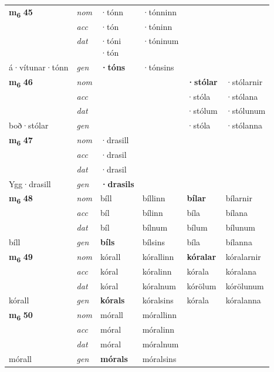 \begin{longtable}[l]{X>{\footnotesize\itshape}XXXXX}
\multirow{3}{*}{{{\textbf{m{\textsubscript{6}}} \Large{\textbf{45}}}}} & nom & ·tónn & ·tónninn & \textbf{} &  \\*
 & acc & ·tón & ·tóninn &  &  \\*
 & dat & \specialcell{·tóni\\  ·tón} & ·tóninum &  &  \\*
 {\footnotesize{á\allowbreak ·vítunar\allowbreak ·tónn}} & gen & \textbf{·tóns} & ·tónsins &  &  \\
\cmidrule{1-6}

\multirow{3}{*}{{{\textbf{m{\textsubscript{6}}} \Large{\textbf{46}}}}} & nom &  &  & \textbf{·stólar} & ·stólarnir \\*
 & acc &  &  & ·stóla & ·stólana \\*
 & dat &  &  & ·stólum & ·stólunum \\*
 {\footnotesize{boð\allowbreak ·stólar}} & gen & \textbf{} &  & ·stóla & ·stólanna \\
\cmidrule{1-6}

\multirow{3}{*}{{{\textbf{m{\textsubscript{6}}} \Large{\textbf{47}}}}} & nom & ·drasill &  & \textbf{} &  \\*
 & acc & ·drasil &  &  &  \\*
 & dat & ·drasil &  &  &  \\*
 {\footnotesize{Ygg\allowbreak ·drasill}} & gen & \textbf{·drasils} &  &  &  \\
\cmidrule{1-6}

\multirow{3}{*}{{{\textbf{m{\textsubscript{6}}} \Large{\textbf{48}}}}} & nom & bíll & bíllinn & \textbf{bílar} & bílarnir \\*
 & acc & bíl & bílinn & bíla & bílana \\*
 & dat & bíl & bílnum & bílum & bílunum \\*
 {\footnotesize{bíll}} & gen & \textbf{bíls} & bílsins & bíla & bílanna \\
\cmidrule{1-6}

\multirow{3}{*}{{{\textbf{m{\textsubscript{6}}} \Large{\textbf{49}}}}} & nom & kórall & kórallinn & \textbf{kóralar} & kóralarnir \\*
 & acc & kóral & kóralinn & kórala & kóralana \\*
 & dat & kóral & kóralnum & kórölum & kórölunum \\*
 {\footnotesize{kórall}} & gen & \textbf{kórals} & kóralsins & kórala & kóralanna \\
\cmidrule{1-6}

\multirow{3}{*}{{{\textbf{m{\textsubscript{6}}} \Large{\textbf{50}}}}} & nom & mórall & mórallinn & \textbf{} &  \\*
 & acc & móral & móralinn &  &  \\*
 & dat & móral & móralnum &  &  \\*
 {\footnotesize{mórall}} & gen & \textbf{mórals} & móralsins &  &  \\
\cmidrule{1-6}


\end{longtable}
